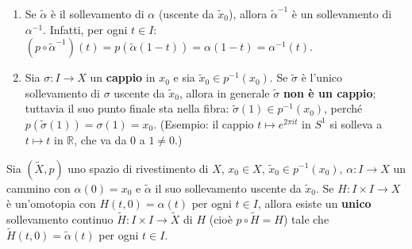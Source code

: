 \begin{observacion}
\begin{enumerate}
    \item Se $\widetilde{\alpha}$ \`e il sollevamento di $\alpha$ (uscente da $\widetilde{x}_0$), allora $\widetilde{\alpha}^{-1}$ \`e un sollevamento di $\alpha^{-1}$. Infatti, per ogni $t \in I$: $(p \circ \widetilde{\alpha}^{-1})(t) = p(\widetilde{\alpha}(1-t)) = \alpha(1-t) = \alpha^{-1}(t)$.
    \item Sia $\sigma: I \to X$ un \textbf{cappio} in $x_0$ e sia $\widetilde{x}_0 \in p^{-1}(x_0)$. Se $\widetilde{\sigma}$ \`e l'unico sollevamento di $\sigma$ uscente da $\widetilde{x}_0$, allora in generale $\widetilde{\sigma}$ \textbf{non \`e un cappio}; tuttavia il suo punto finale sta nella fibra: $\widetilde{\sigma}(1) \in p^{-1}(x_0)$, perch\'e $p(\widetilde{\sigma}(1)) = \sigma(1) = x_0$. (Esempio: il cappio $t \mapsto e^{2\pi i t}$ in $S^1$ si solleva a $t \mapsto t$ in $\mathbb{R}$, che va da $0$ a $1 \neq 0$.)
\end{enumerate}
\end{observacion}

\begin{teo}
Sia $(\widetilde{X}, p)$ uno spazio di rivestimento di $X$, $x_0 \in X$, $\widetilde{x}_0 \in p^{-1}(x_0)$, $\alpha: I \to X$ un cammino con $\alpha(0) = x_0$ e $\widetilde{\alpha}$ il suo sollevamento uscente da $\widetilde{x}_0$. Se $H: I \times I \to X$ \`e un'omotopia con $H(t,0) = \alpha(t)$ per ogni $t \in I$, allora esiste un \textbf{unico} sollevamento continuo $\widetilde{H}: I \times I \to \widetilde{X}$ di $H$ (cio\`e $p \circ \widetilde{H} = H$) tale che $\widetilde{H}(t,0) = \widetilde{\alpha}(t)$ per ogni $t \in I$.
\end{teo}

